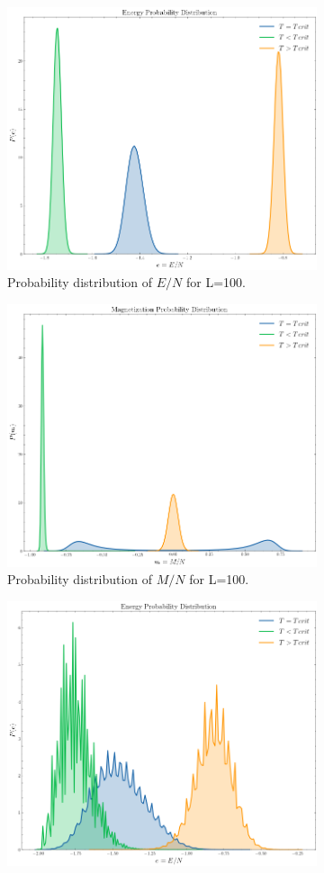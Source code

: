 \documentclass[article]{revtex4}
\begin{document}
\begin{figure}[h!]
\begin{subfigure}{.5\textwidth}
  \centering
  \includegraphics[width=0.7\linewidth]{hist_EL100.png}
  \caption{Probability distribution of $E/N$ for L=100.}
\end{subfigure}%
\begin{subfigure}{.5\textwidth}
  \centering
  \includegraphics[width=0.7\linewidth]{hist_L100.png}
  \caption{Probability distribution of $M/N$ for L=100.}
\end{subfigure}
\caption{Probability distribution of $E/N$ and $M/N$ for different thermal behaviour.}
\begin{subfigure}{.5\textwidth}
  \centering
  \includegraphics[width=0.7\linewidth]{hist_EL16.png}

\end{subfigure}
\end{figure}
\end{document}
